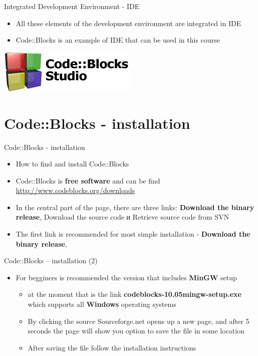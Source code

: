 \begin{frame}{Integrated Development Environment - IDE}
\begin{itemize}
  \item All these elements of the development environment are integrated in IDE
  \item Code::Blocks is an example of IDE that can be used in this course
\end{itemize}
\begin{center}
\includegraphics[scale=0.5]{images/cb_logo}
\end{center}
\end{frame}

\section{Code::Blocks - installation}
\begin{frame}{Code::Blocks - installation}
\begin{itemize}
  \item How to find and install Code::Blocks
  \item Code::Blocks is \textbf{free software} and can be find \linebreak
  \href{http://www.codeblocks.org/downloads}{http://www.codeblocks.org/downloads}
  \item In the central part of the page, there are three links:
  \textbf{Download the binary release}, Download the source code и Retrieve source code from SVN
  \item The first link is recommended for most simple installation
  - \textbf{Download the binary release},
\end{itemize}
\end{frame}

\begin{frame}{Code::Blocks – installation (2)}
\begin{itemize}
  \item For begginers is recommended the version that includes \textbf{MinGW} setup
    \begin{itemize}
  \item at the moment that is the link \textbf{codeblocks-10.05mingw-setup.exe}
  which supports all \textbf{Windows} operating systems
  \item By clicking the source Sourceforge.net opens up a new page, and after 5
  seconds the page will show you option to save the file in some location
  \item After saving the file follow the installation instructions
    \end{itemize}
\end{itemize}
\end{frame}

